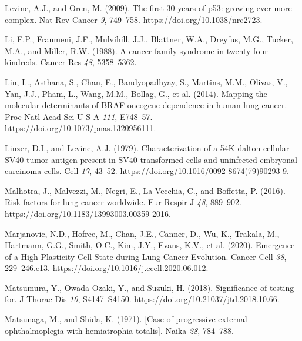 \begin{CSLReferences}{0}{0}
\leavevmode{}%
Levine, A.J., and Oren, M. (2009). The first 30 years of p53: growing ever more complex. Nat Rev Cancer \emph{9}, 749--758. \url{https://doi.org/10.1038/nrc2723}.

\leavevmode{}%
Li, F.P., Fraumeni, J.F., Mulvihill, J.J., Blattner, W.A., Dreyfus, M.G., Tucker, M.A., and Miller, R.W. (1988). \href{https://www.ncbi.nlm.nih.gov/pubmed/3409256}{A cancer family syndrome in twenty-four kindreds.} Cancer Res \emph{48}, 5358--5362.

\leavevmode{}%
Lin, L., Asthana, S., Chan, E., Bandyopadhyay, S., Martins, M.M., Olivas, V., Yan, J.J., Pham, L., Wang, M.M., Bollag, G., et al. (2014). Mapping the molecular determinants of BRAF oncogene dependence in human lung cancer. Proc Natl Acad Sci U S A \emph{111}, E748--57. \url{https://doi.org/10.1073/pnas.1320956111}.

\leavevmode{}%
Linzer, D.I., and Levine, A.J. (1979). Characterization of a 54K dalton cellular SV40 tumor antigen present in SV40-transformed cells and uninfected embryonal carcinoma cells. Cell \emph{17}, 43--52. \url{https://doi.org/10.1016/0092-8674(79)90293-9}.

\leavevmode{}%
Malhotra, J., Malvezzi, M., Negri, E., La Vecchia, C., and Boffetta, P. (2016). Risk factors for lung cancer worldwide. Eur Respir J \emph{48}, 889--902. \url{https://doi.org/10.1183/13993003.00359-2016}.

\leavevmode{}%
Marjanovic, N.D., Hofree, M., Chan, J.E., Canner, D., Wu, K., Trakala, M., Hartmann, G.G., Smith, O.C., Kim, J.Y., Evans, K.V., et al. (2020). Emergence of a High-Plasticity Cell State during Lung Cancer Evolution. Cancer Cell \emph{38}, 229--246.e13. \url{https://doi.org/10.1016/j.ccell.2020.06.012}.

\leavevmode{}%
Matsumura, Y., Owada-Ozaki, Y., and Suzuki, H. (2018). Significance of testing for. J Thorac Dis \emph{10}, S4147--S4150. \url{https://doi.org/10.21037/jtd.2018.10.66}.

\leavevmode{}%
Matsunaga, M., and Shida, K. (1971). \href{https://www.ncbi.nlm.nih.gov/pubmed/5130083}{{[}Case of progressive external ophthalmoplegia with hemiatrophia totalis{]}.} Naika \emph{28}, 784--788.


\end{CSLReferences}
